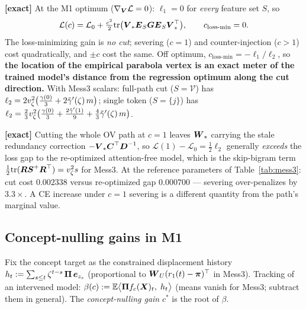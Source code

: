 \documentclass{article}
\begin{document}
\begin{corollary}\label{cor:vertex}
\textbf{[exact]} At the M1 optimum ($\nabla_{\boldsymbol{V}}\mathcal{L} = 0$): $\ell_1 = 0$ for \emph{every} feature set $S$, so
\begin{equation}
    \mathcal{L}(c) = \mathcal{L}_0 + \tfrac{c^2}{2}\textrm{tr}\big(\boldsymbol{V}_*\boldsymbol{E}_S\boldsymbol{G}\boldsymbol{E}_S\boldsymbol{V}_*^\top\big),
    \qquad c_{\text{loss-min}} = 0 .
\end{equation}
The loss-minimizing gain is \emph{no cut}; severing ($c = 1$) and counter-injection ($c > 1$) cost quadratically, and $\pm c$ cost the same. Off optimum, $c_{\text{loss-min}} = -\ell_1/\ell_2$, so \textbf{the location of the empirical parabola vertex is an exact meter of the trained model's distance from the regression optimum along the cut direction.} With Mess3 scalars: full-path cut ($S = \mathcal{V}$) has $\ell_2 = 2v_\zeta^2\big(\tfrac{\gamma(0)}{3} + 2\Tilde{\gamma}'(\zeta)\, m\big)$; single token ($S = \{j\}$) has $\ell_2 = \tfrac23 v_\zeta^2\big(\tfrac{\gamma(0)}{3} + \tfrac{2\Tilde{\gamma}'(1)}{9} + \tfrac43\Tilde{\gamma}'(\zeta)\, m\big)$.
\end{corollary}

\begin{corollary}\label{cor:amputation}
\textbf{[exact]} Cutting the whole OV path at $c = 1$ leaves $\boldsymbol{W}_*$ carrying the stale redundancy correction $-\boldsymbol{V}_*\boldsymbol{C}^\top\boldsymbol{D}^{-1}$, so $\mathcal{L}(1) - \mathcal{L}_0 = \tfrac12\ell_2$ generally \emph{exceeds} the loss gap to the re-optimized attention-free model, which is the skip-bigram term $\tfrac12\textrm{tr}(\boldsymbol{R}\boldsymbol{S}^+\boldsymbol{R}^\top) = v_\zeta^2 s$ for Mess3. At the reference parameters of Table~\ref{tab:mess3}: cut cost $0.002338$ versus re-optimized gap $0.000700$ --- severing over-penalizes by $3.3\times$. A CE increase under $c = 1$ severing is a different quantity from the path's marginal value.
\end{corollary}

\subsection{Concept-nulling gains in M1}

\begin{definition}
Fix the concept target as the constrained displacement history $h_t := \sum_{s\le t}\zeta^{t-s}\,\boldsymbol{\Pi}\,\boldsymbol{e}_{z_s}$ (proportional to $\boldsymbol{W}_U(r_1(t) - \boldsymbol{\pi})^\top$ in Mess3). Tracking of an intervened model: $\beta(c) := \mathbb{E}\big\langle\boldsymbol{\Pi} f_c(\boldsymbol{X})_t,\; h_t\big\rangle$ (means vanish for Mess3; subtract them in general). The \emph{concept-nulling gain} $c^*$ is the root of $\beta$.
\end{definition}
\end{document}
